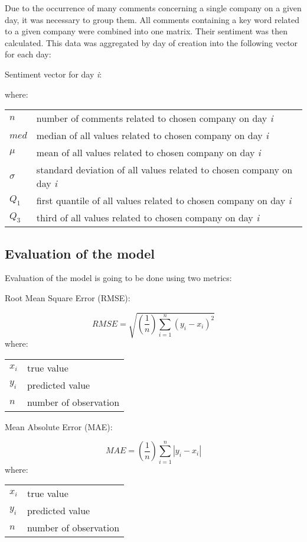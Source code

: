 \documentclass[11pt]{article} %
\makeatletter
\newenvironment{conditions}
  {\par\vspace{\abovedisplayskip}\noindent\begin{tabular}{>{$}l<{$} @{${}={}$} l}}
  {\end{tabular}\par\vspace{\belowdisplayskip}}
\makeatother
\begin{document}
Due to the occurrence of many comments concerning a single company on a given day, it was necessary to group them. All comments containing a key word related to a given company were combined into one matrix. Their sentiment was then calculated. This data was aggregated by day of creation into the following vector for each day: 
\begin{center}   Sentiment vector for day \emph{i}:\end{center}
\begin{equation} [n, \mu, \sigma, med, Q_1, Q_3] \end{equation}
where:
\begin{conditions}
 n     &  number of comments related to chosen company on day \emph{i}\\
 med     &  median of all values related to chosen company on day \emph{i} \\  
\mu    &  mean of all values related to chosen company on day \emph{i} \\    
\sigma    &  standard deviation of all values related to chosen company on day \emph{i} \\   
Q_1     &  first quantile of all values related to chosen company on day \emph{i} \\   
Q_3     &  third of all values related to chosen company on day \emph{i} \\   
\end{conditions}

\subsection{Evaluation of the model}

Evaluation of the model is going to be done using two metrics:  \\ 

\begin{center}   Root Mean Square Error (RMSE):  \end{center}
\begin{equation}  RMSE = \sqrt{(\frac{1}{n})\sum_{i=1}^{n}(y_{i} - x_{i})^{2}} \end{equation}
where:
\begin{conditions}
 x_i     &  true value \\
 y_i     &  predicted value \\   
 n &  number of observation
\end{conditions}

\begin{center}  Mean Absolute Error (MAE): \end{center}
\begin{equation} MAE =(\frac{1}{n})\sum_{i=1}^{n}\left | y_{i} - x_{i} \right | \end{equation}
where:
\begin{conditions}
 x_i     &  true value \\
 y_i     &  predicted value \\   
 n &  number of observation
\end{conditions}
\end{document}
